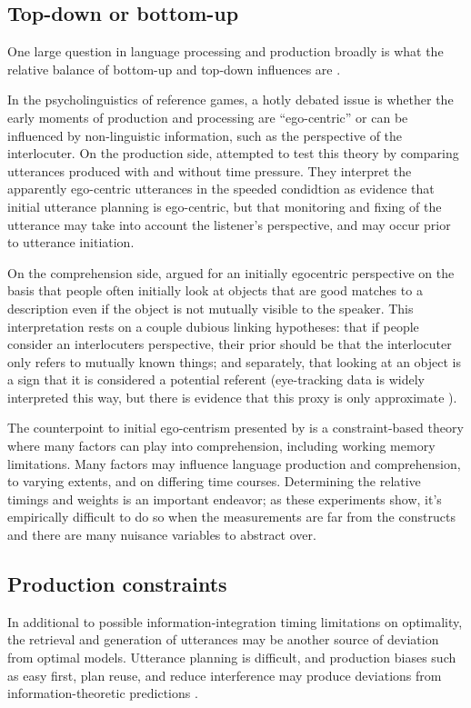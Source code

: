 \documentclass[]{article}
\begin{document}
\subsection{Top-down or bottom-up}
One large question in language processing and production broadly is what the relative balance of bottom-up and top-down influences are \citep{gwilliams2022,tanenhaus1995,horton2005, horton1996}. 

In the psycholinguistics of reference games, a hotly debated issue is whether the early moments of production and processing are ``ego-centric'' or can be influenced by non-linguistic information, such as the perspective of the interlocuter. On the production side, \citet{horton1996} attempted to test this theory by comparing utterances produced with and without time pressure. They interpret the apparently ego-centric utterances in the speeded condidtion as evidence that initial utterance planning is ego-centric, but that monitoring and fixing of the utterance may take into account the listener's perspective, and may occur prior to utterance initiation. 

On the comprehension side, \citet{keysar2000} argued for an initially egocentric perspective on the basis that people often initially look at objects that are good matches to a description even if the object is not mutually visible to the speaker. This interpretation rests on a couple dubious linking hypotheses: that if people consider an interlocuters perspective, their prior should be that the interlocuter only refers to mutually known things;  and separately, that looking at an object is a sign that it is considered a potential referent (eye-tracking data is widely interpreted this way, but there is evidence that this proxy is only approximate \citet{degena}).

The counterpoint to initial ego-centrism presented by \citet{hanna2003} is a constraint-based theory where many factors can play into comprehension, including working memory limitations. Many factors may influence language production and comprehension, to varying extents, and on differing time courses. Determining the relative timings and weights is an important endeavor; as these experiments show, it's empirically difficult to do so when the measurements are far from the constructs and there are many nuisance variables to abstract over. 

\subsection{Production constraints}
In additional to possible information-integration timing limitations on optimality, the retrieval and generation of utterances may be another source of deviation from optimal models. Utterance planning is difficult, and production biases such as easy first, plan reuse, and reduce interference may produce deviations from information-theoretic predictions \citep{macdonald2013}.
\end{document}
